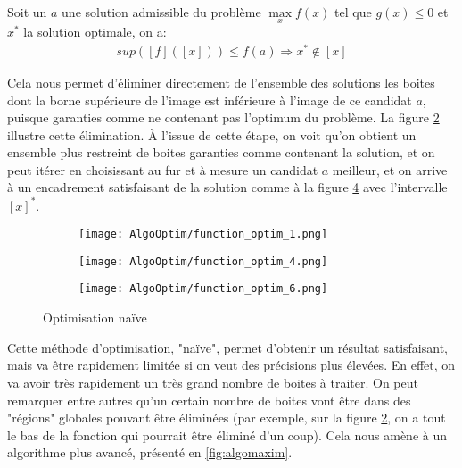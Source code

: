 \begin{theoreme}
  \label{thm:solutionsup}
  Soit un $a$ une solution admissible du problème $\max\limits_{x} f(x)$ tel que $g(x) \leq 0$ et $x^*$ la solution optimale, on a:
  \begin{align}
      sup([f]([x])) \leq f(a) \Rightarrow x^* \notin [x]
  \end{align}
\end{theoreme}

Cela nous permet d'éliminer directement de l'ensemble des solutions les boites dont la borne supérieure de l'image est inférieure à l'image de ce candidat $a$, puisque garanties comme ne contenant pas l'optimum du problème. La figure \ref{fig:optim2} illustre cette élimination. \`A l'issue de cette étape, on voit qu'on obtient un ensemble plus restreint de boites garanties comme contenant la solution, et on peut itérer en choisissant au fur et à mesure un candidat $a$ meilleur, et on arrive à un encadrement satisfaisant de la solution comme à la figure \ref{fig:optim3} avec l'intervalle $[x]^*$.

\begin{figure}[H]
  \centering
  \begin{subfigure}[h]{0.3\textwidth}
      \centering
      \texttt{[image: AlgoOptim/function\_optim\_1.png]}
      \caption{}
      \label{fig:optim1}
  \end{subfigure}
  \begin{subfigure}[h]{0.3\textwidth}
      \centering
      \texttt{[image: AlgoOptim/function\_optim\_4.png]}
      \caption{}
      \label{fig:optim2}
  \end{subfigure}
  \begin{subfigure}[h]{0.3\textwidth}
      \centering
      \texttt{[image: AlgoOptim/function\_optim\_6.png]}
      \caption{}
      \label{fig:optim3}
  \end{subfigure}
  \caption{Optimisation naïve}
\end{figure}

Cette méthode d'optimisation, "naïve", permet d'obtenir un résultat satisfaisant, mais va être rapidement limitée si on veut des précisions plus élevées. En effet, on va avoir très rapidement un très grand nombre de boites à traiter. On peut remarquer entre autres qu'un certain nombre de boites vont être dans des "régions" globales pouvant être éliminées (par exemple, sur la figure \ref{fig:optim2}, on a tout le bas de la fonction qui pourrait être éliminé d'un coup). Cela nous amène à un algorithme plus avancé, présenté en \ref{fig:algomaxim}.


